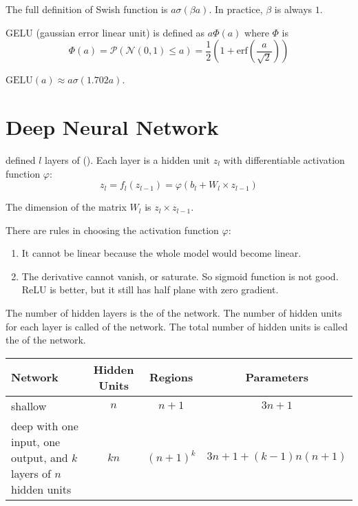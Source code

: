 \begin{example}[Swish]
    The full definition of Swish function is $a\sigma(\beta a)$. In practice, $\beta$ is always $1$. 
\end{example}

\begin{example}[GELU]
    GELU (gaussian error linear unit) is defined as $a \Phi(a)$ where $\Phi$ is
    \begin{equation}
        \Phi(a) = \mathcal{P}(\mathcal{N}(0,1) \leq a) = \frac{1}{2}\left(1+\text{erf}\left(\frac{a}{\sqrt{2}}\right)\right)
    \end{equation}
    
    $\text{GELU}(a) \approx a \sigma(1.702 a)$. 
\end{example}



\section{Deep Neural Network}

 defined $l$ layers of  (). Each layer is a hidden unit $z_l$ with differentiable activation function $\varphi$:
\begin{equation}
    z_l = f_l (z_{l-1}) = \varphi (b_l + W_l \times z_{l-1})
\end{equation}

The dimension of the matrix $W_l$ is $z_l \times z_{l-1}$.

There are rules in choosing the activation function $\varphi$:
\begin{enumerate}
    \item It cannot be linear because the whole model would become linear.
    \item The derivative cannot vanish, or saturate. So sigmoid function is not good. ReLU is better, but it still has half plane with zero gradient.
\end{enumerate}

The number of hidden layers is the  of the network. The number of hidden units for each layer is called  of the network. The total number of hidden units is called the  of the network.

\begin{table}[H]
\centering
\begin{tabular}[t]{p{5cm}ccc}
Network & Hidden Units & Regions & Parameters \\ \hline
shallow & $n$ & $n+1$ & $3n+1$\\
deep with one input, one output, and $k$ layers of $n$ hidden units & $k n$ & $(n+1)^k$ & $3n+1+(k-1)n(n+1)$ \\
\end{tabular}
\end{table}


